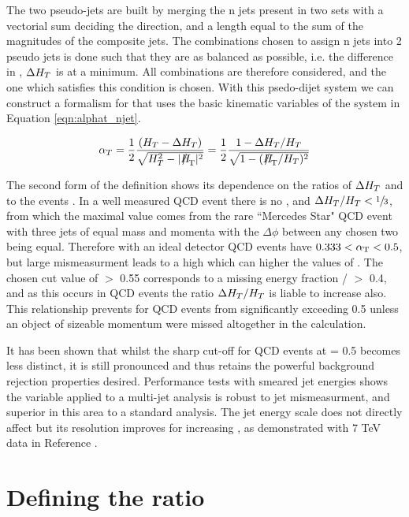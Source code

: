 The two pseudo-jets are built by merging the n jets present in two sets with a vectorial sum deciding the direction, and a length equal to the sum of the magnitudes of the composite jets. The combinations chosen to assign n jets into 2 pseudo jets is done such that they are as balanced as possible, i.e. the difference in \HT, $\Delta H_{T} $ is at a minimum. All combinations are therefore considered, and the one which satisfies this condition is chosen. With this psedo-dijet system we can construct a formalism for \alt that uses the basic kinematic variables of the system in Equation \ref{eqn:alphat_njet}. 

\begin{equation}
\alpha_{T} =\frac{1}{2} \frac{(\HT - \Delta \HT)}{\sqrt{\HT^{2} - |\mht|^{2}}}  = \frac{1}{2} \frac{1-\Delta \HT / \HT}{\sqrt{1 - (\mht / \HT)^{2}}}
\label{eqn:alphat_njet}
\end{equation}

The second form of the definition shows its dependence on the ratios of $\Delta H_{T} $ and \mht to the events \HT. In a well measured QCD event there is no \mht, and $\Delta H_{T}  / H_{T}  < \sfrac{1}{3}$, from which the maximal value comes from the rare ``Mercedes Star" QCD event with three jets of equal mass and momenta with the $\Delta \phi$ between any chosen two being equal. Therefore with an ideal detector QCD events have $0.333 < \alpha_{\text{T}} < 0.5$, but large mismeasurment leads to a high \mht which can higher the values of \alt. The chosen cut value of \alt $>$ 0.55 corresponds to a missing energy fraction \mht / \HT $>$ 0.4, and as this occurs in QCD events the ratio $\Delta H_{T}  / H_{T} $ is liable to increase also. This relationship prevents \alt for QCD events from significantly exceeding 0.5 unless an object of sizeable momentum were missed altogether in the calculation. 

It has been shown that whilst the sharp cut-off for QCD events at \alt = 0.5 becomes less distinct, it is still pronounced and thus retains the powerful background rejection properties desired\cite{an2009_56}. Performance tests with smeared jet energies shows the \alt variable applied to a multi-jet analysis is robust to jet mismeasurment, and superior in this area to a standard \met analysis. The jet energy scale does not directly affect \alt but its resolution improves for increasing \HT, as demonstrated with 7 TeV data in Reference \cite{an2010_119}. 

\section{Defining the ratio \RaT}
\label{sec:atrat}

